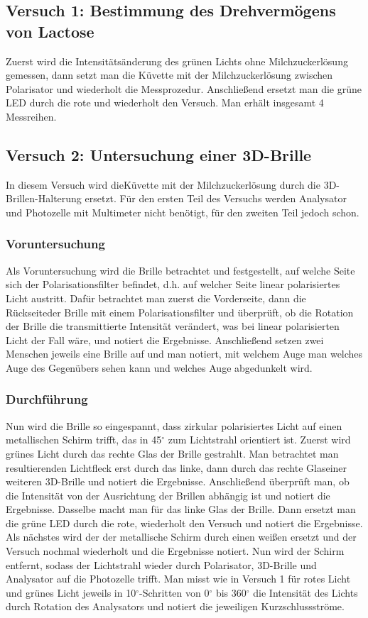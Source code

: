 \documentclass[fontsize=12pt]{scrartcl}
\begin{document}
\subsection{Versuch 1: Bestimmung des Drehvermögens von Lactose}
Zuerst wird die Intensitätsänderung des grünen Lichts ohne Milchzuckerlösung gemessen, dann setzt man die Küvette mit der Milchzuckerlösung zwischen 
Polarisator und wiederholt die Messprozedur.  Anschließend ersetzt man die grüne LED durch die rote und wiederholt den Versuch. Man erhält insgesamt 4 
Messreihen.

\subsection{Versuch 2: Untersuchung einer 3D-Brille}

In diesem Versuch wird dieKüvette mit der Milchzuckerlösung durch die 3D-Brillen-Halterung ersetzt. Für den ersten Teil des Versuchs werden Analysator 
und Photozelle mit Multimeter nicht benötigt, für den zweiten Teil jedoch schon.

\subsubsection{Voruntersuchung}
Als Voruntersuchung wird die Brille betrachtet und festgestellt, auf welche Seite sich der Polarisationsfilter befindet, d.h. auf welcher Seite linear polarisiertes 
Licht austritt. Dafür betrachtet man zuerst die Vorderseite, dann die Rückseiteder Brille mit einem Polarisationsfilter und überprüft, ob die Rotation der Brille 
die transmittierte Intensität verändert, was bei linear polarisierten Licht der Fall wäre, und notiert die Ergebnisse. Anschließend setzen zwei Menschen jeweils 
eine Brille auf und man notiert, mit welchem Auge man welches Auge des Gegenübers sehen kann und welches Auge abgedunkelt wird.

\subsubsection{Durchführung}
Nun wird die Brille so eingespannt, dass zirkular polarisiertes Licht auf einen metallischen Schirm trifft, das in 45$^\circ$ zum Lichtstrahl orientiert ist. Zuerst 
wird grünes Licht durch das rechte \glqq Glas \grqq  der Brille gestrahlt. Man betrachtet man resultierenden Lichtfleck erst durch das linke, dann durch das 
rechte Glaseiner weiteren 3D-Brille und notiert die Ergebnisse. Anschließend überprüft man, ob die Intensität von der Ausrichtung der Brillen abhängig ist und 
notiert die Ergebnisse. Dasselbe macht man für das linke Glas der Brille.
Dann ersetzt man die grüne LED durch die rote, wiederholt den Versuch und notiert die Ergebnisse.
Als nächstes wird der der metallische Schirm durch einen weißen ersetzt und der Versuch nochmal wiederholt und die Ergebnisse notiert.
Nun wird der Schirm entfernt, sodass der Lichtstrahl wieder durch Polarisator, 3D-Brille und Analysator auf die Photozelle trifft. Man misst wie in Versuch 1 
für rotes Licht und grünes Licht jeweils in 10$^\circ$-Schritten von 0$^\circ$ bis 360$^\circ$ die Intensität des Lichts durch Rotation des Analysators und 
notiert die jeweiligen Kurzschlussströme. 
\newpage
\end{document}

